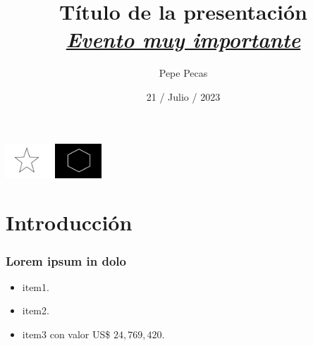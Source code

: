 \documentclass[aspectratio=169, xcolor=table]{beamer}
\title[Tíulo corto]{Título de la presentación\\ \underline{ \textit{Evento muy importante}} } %
\author{Pepe Pecas} %
\institute[Universidad] %
{
Universidad muy importante\\
Institución muy importante\\ %
\textit{john@smith.com} %
}
\date{ 21 / Julio / 2023} %
\begin{document}
\begin{frame}

 \begin{center}
 \includegraphics[width=0.13\textwidth]{./img/logo1.png}\hspace{10cm}%
 \includegraphics[width=0.13\textwidth]{./img/logo2.png}
 \end{center}

\titlepage %
\end{frame}


\section{Introducción}

\begin{frame}\frametitle{Lorem ipsum in dolo }

  \lipsum[1][1]
  
  \begin{itemize}
   \item item1.
   \item item2.
   \item item3 con valor US\$ $24, 769, 420$.
  \end{itemize}

\end{frame}
\end{document}

